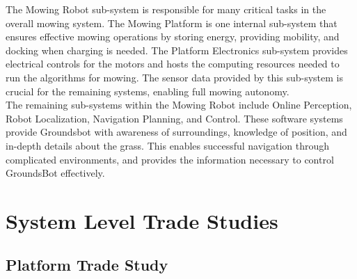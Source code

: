 \documentclass{article}
\begin{document}
  The Mowing Robot sub-system is responsible for many critical tasks in the overall mowing system. The Mowing Platform is one internal sub-system that ensures effective mowing operations by storing energy, providing mobility, and docking when charging is needed. The Platform Electronics sub-system provides electrical controls for the motors and hosts the computing resources needed to run the algorithms for mowing. The sensor data provided by this sub-system is crucial for the remaining systems, enabling full mowing autonomy.\\
  
  The remaining sub-systems within the Mowing Robot include Online Perception, Robot Localization, Navigation Planning, and Control. These software systems provide Groundsbot with awareness of surroundings, knowledge of position, and in-depth details about the grass. This enables successful navigation through complicated environments, and provides the information necessary to control GroundsBot effectively.\\

\section{System Level Trade Studies}
	\subsection{Platform Trade Study}
\end{document}
